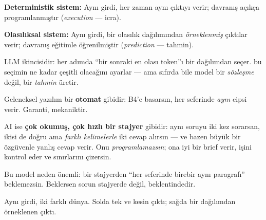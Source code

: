 \begin{problembox}
\textbf{Deterministik sistem:} Aynı girdi, her zaman aynı çıktıyı verir;
davranış açıkça programlanmıştır (\emph{execution} --- icra).

\smallskip
\textbf{Olasılıksal sistem:} Aynı girdi, bir olasılık dağılımından
\emph{örneklenmiş} çıktılar verir; davranış eğitimle öğrenilmiştir
(\emph{prediction} --- tahmin).
\end{problembox}

LLM ikincisidir: her adımda ``bir sonraki en olası token''ı bir dağılımdan seçer.
 bu seçimin ne kadar çeşitli olacağını ayarlar --- ama sıfırda
bile model bir \emph{sözleşme} değil, bir \emph{tahmin} üretir.

\begin{mentalbox}
Geleneksel yazılım bir \textbf{otomat} gibidir: B4'e basarsın, her seferinde
\emph{aynı} cipsi verir. Garanti, mekaniktir.

\smallskip
AI ise \textbf{çok okumuş, çok hızlı bir stajyer} gibidir: aynı soruyu iki kez
sorarsan, ikisi de doğru ama \emph{farklı kelimelerle} iki cevap alırsın ---
ve bazen büyük bir özgüvenle yanlış cevap verir. Onu \emph{programlamazsın};
ona iyi bir brief verir, işini kontrol eder ve sınırlarını çizersin.
\end{mentalbox}

Bu model neden önemli: bir stajyerden ``her seferinde birebir aynı paragrafı''
beklemezsin. Beklersen sorun stajyerde değil, beklentindedir.

Aynı girdi, iki farklı dünya. Solda tek ve kesin çıktı; sağda bir dağılımdan
örneklenen çıktı.

